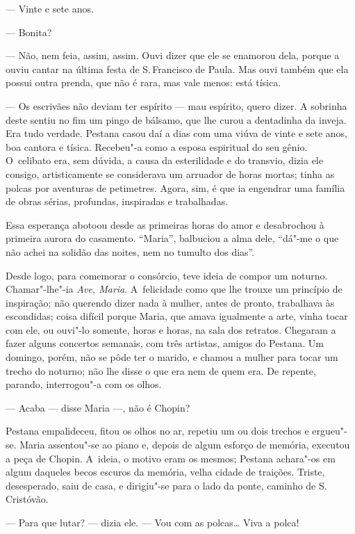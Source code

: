 \begin{linenumbers}
--- Vinte e sete anos.

--- Bonita?

--- Não, nem feia, assim, assim. Ouvi dizer que ele se enamorou dela,
porque a ouviu cantar na última festa de S.\,Francisco de Paula. Mas ouvi
também que ela possui outra prenda, que não é rara, mas vale menos: está
tísica.

--- Os escrivães não deviam ter espírito --- mau espírito, quero dizer. A
sobrinha deste sentiu no fim um pingo de bálsamo, que lhe curou a
dentadinha da inveja. Era tudo verdade. Pestana casou daí a dias com uma
viúva de vinte e sete anos, boa cantora e tísica. Recebeu"-a como a
esposa espiritual do seu gênio. O~celibato era, sem dúvida, a causa da
esterilidade e do transvio, dizia ele consigo, artisticamente se
considerava um arruador de horas mortas; tinha as polcas por aventuras
de petimetres. Agora, sim, é que ia engendrar uma família de obras
sérias, profundas, inspiradas e trabalhadas.

Essa esperança abotoou desde as primeiras horas do amor e desabrochou à
primeira aurora do casamento. ``Maria'', balbuciou a alma dele, ``dá"-me
o que não achei na solidão das noites, nem no tumulto dos dias''.

Desde logo, para comemorar o consórcio, teve ideia de compor um noturno.
Chamar"-lhe"-ia \emph{Ave, Maria}. A~felicidade como que lhe trouxe um
princípio de inspiração; não querendo dizer nada à mulher, antes de
pronto, trabalhava às escondidas; coisa difícil porque Maria, que amava
igualmente a arte, vinha tocar com ele, ou ouvi"-lo somente, horas e
horas, na sala dos retratos. Chegaram a fazer alguns concertos semanais,
com três artistas, amigos do Pestana. Um domingo, porém, não se pôde ter
o marido, e chamou a mulher para tocar um trecho do noturno; não lhe
disse o que era nem de quem era. De repente, parando, interrogou"-a com
os olhos.

--- Acaba --- disse Maria ---, não é Chopin?

Pestana empalideceu, fitou os olhos no ar, repetiu um ou dois trechos e
ergueu"-se. Maria assentou"-se ao piano e, depois de algum esforço de
memória, executou a peça de Chopin. A~ideia, o motivo eram os mesmos;
Pestana achara"-os em algum daqueles becos escuros da memória, velha
cidade de traições. Triste, desesperado, saiu de casa, e dirigiu"-se para
o lado da ponte, caminho de S.\,Cristóvão.

--- Para que lutar? --- dizia ele. --- Vou com as polcas\ldots{} Viva a polca!


\end{linenumbers}
